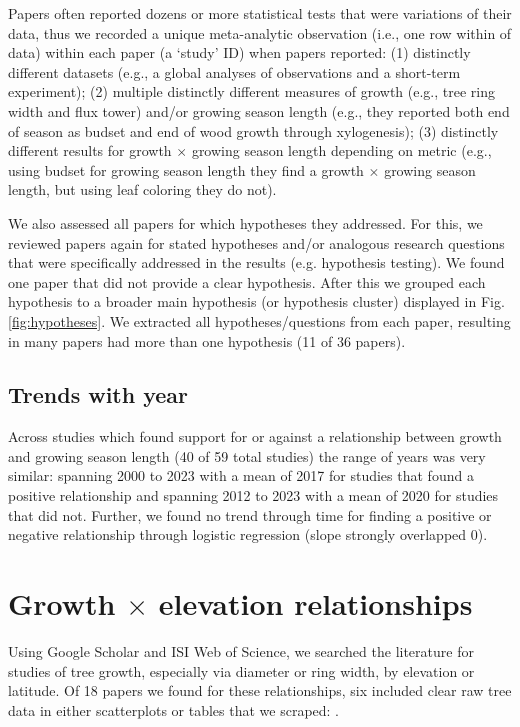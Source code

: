 \documentclass[11pt]{article}
\begin{document}
Papers often reported dozens or more statistical tests that were variations of their data, thus we recorded a unique meta-analytic observation (i.e., one row within of data) within each paper (a `study' ID) when papers reported: (1) distinctly different datasets (e.g., a global analyses of observations and a short-term experiment); (2) multiple distinctly different measures of growth (e.g., tree ring width and flux tower) and/or growing season length (e.g., they reported both end of season as budset and end of wood growth through xylogenesis); (3) distinctly different results for growth $\times$  growing season length depending on metric (e.g., using budset for growing season length they find a growth $\times$ growing season length, but using leaf coloring they do not). 

We also assessed all papers for which hypotheses they addressed. For this, we reviewed papers again for stated hypotheses and/or analogous research questions that were specifically addressed in the results (e.g. hypothesis testing).  We found one paper that did not provide a clear hypothesis. After this we grouped each hypothesis to a broader main hypothesis (or hypothesis cluster) displayed in Fig. \ref{fig:hypotheses}. We extracted all hypotheses/questions from each paper, resulting in many papers had more than one hypothesis (11 of 36 papers). %

\subsection*{Trends with year}
Across studies which found support for or against a relationship between growth and growing season length (40 of 59 total studies) the range of years was very similar: spanning 2000 to 2023 with a mean of 2017 for studies that found a positive relationship and spanning 2012 to 2023 with a mean of 2020 for studies that did not. Further, we found no trend through time for finding a positive or negative relationship through logistic regression (slope strongly overlapped 0). 

\section{Growth $\times$ elevation relationships}

Using Google Scholar and ISI Web of Science, we searched the literature for studies of tree growth, especially via diameter or ring width, by elevation or latitude. Of 18 papers we found for these relationships, six included clear raw tree data in either scatterplots or tables that we scraped: \citet{oleksyn1998growth,huang2010radial,cavin2017highest,wang2017climatic,zhu2018spatial,zhou2022altitudinal}. 
\end{document}
